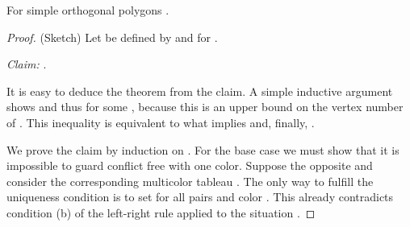 \documentclass[a4paper,USenglish,numberwithinsect]{lipics}
\theoremstyle{plain}
\begin{document}
\begin{theorem}
\label{r-cf-lowerbound} For simple orthogonal polygons
.
\end{theorem}
\begin{proof}(Sketch)
Let   be defined by  and  for
.

\noindent
{\em Claim:}
.


\noindent
It is easy to  deduce the theorem from the claim. A simple inductive
argument shows 
 and thus  for some  ,
because this  is an upper bound on the vertex number of   .
This inequality is equivalent to  what implies
 and, finally,
.  


We prove the claim by induction on . For the base case 
we must show that it is impossible to guard  conflict free with one
color.
Suppose the opposite and consider the corresponding multicolor tableau
. The only way to
fulfill
the uniqueness condition is to set  for all pairs
 and color . This already  contradicts  condition
(b) of the
left-right rule applied to the situation .



\end{proof}
\end{document}
